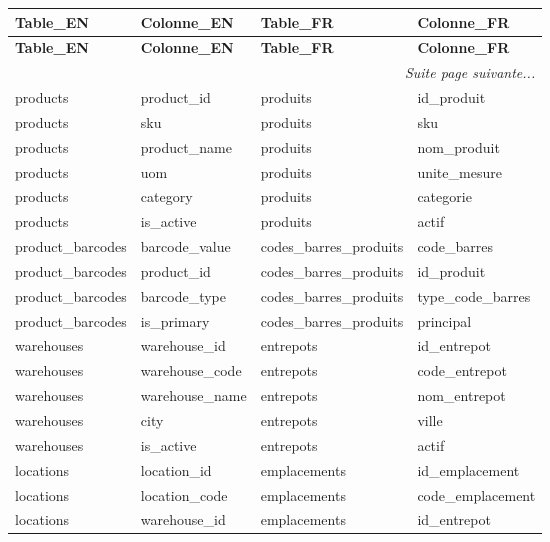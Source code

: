 \documentclass[a4paper,11pt]{article}
\begin{document}
\scriptsize
\begin{longtable}{|l|l|l|l|}
\hline
\rowcolor{headerblue}
\textbf{Table\_EN} & \textbf{Colonne\_EN} & \textbf{Table\_FR} & \textbf{Colonne\_FR} \\ \hline
\endfirsthead
\hline
\rowcolor{headerblue}
\textbf{Table\_EN} & \textbf{Colonne\_EN} & \textbf{Table\_FR} & \textbf{Colonne\_FR} \\ \hline
\endhead
\hline \multicolumn{4}{|r|}{\textit{Suite page suivante...}} \\ \hline
\endfoot
\hline
\endlastfoot
 products & product\_id & produits & id\_produit \\ \hline
\rowcolor{rowgray} products & sku & produits & sku \\ \hline
 products & product\_name & produits & nom\_produit \\ \hline
\rowcolor{rowgray} products & uom & produits & unite\_mesure \\ \hline
 products & category & produits & categorie \\ \hline
\rowcolor{rowgray} products & is\_active & produits & actif \\ \hline
 product\_barcodes & barcode\_value & codes\_barres\_produits & code\_barres \\ \hline
\rowcolor{rowgray} product\_barcodes & product\_id & codes\_barres\_produits & id\_produit \\ \hline
 product\_barcodes & barcode\_type & codes\_barres\_produits & type\_code\_barres \\ \hline
\rowcolor{rowgray} product\_barcodes & is\_primary & codes\_barres\_produits & principal \\ \hline
 warehouses & warehouse\_id & entrepots & id\_entrepot \\ \hline
\rowcolor{rowgray} warehouses & warehouse\_code & entrepots & code\_entrepot \\ \hline
 warehouses & warehouse\_name & entrepots & nom\_entrepot \\ \hline
\rowcolor{rowgray} warehouses & city & entrepots & ville \\ \hline
 warehouses & is\_active & entrepots & actif \\ \hline
\rowcolor{rowgray} locations & location\_id & emplacements & id\_emplacement \\ \hline
 locations & location\_code & emplacements & code\_emplacement \\ \hline
\rowcolor{rowgray} locations & warehouse\_id & emplacements & id\_entrepot \\ \hline

\end{longtable}
\end{document}
